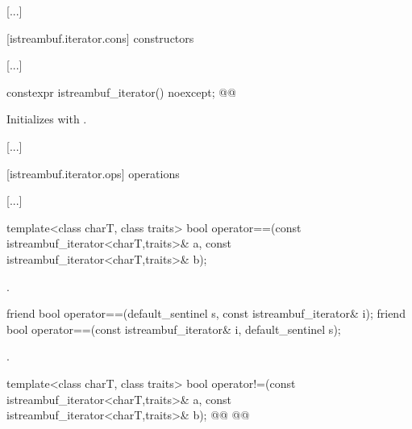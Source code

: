 [...]

\setcounter{subsubsection}{1}
[istreambuf.iterator.cons]{ constructors}

[...]

\setcounter{Paras}{1}
%
\begin{itemdecl}
constexpr istreambuf_iterator() noexcept;
@@
\end{itemdecl}

\begin{itemdescr}
\pnum
\effects
Initializes  with .
\end{itemdescr}

[...]

[istreambuf.iterator.ops]{ operations}

[...]

\setcounter{Paras}{5}
%
\begin{itemdecl}
template<class charT, class traits>
  bool operator==(const istreambuf_iterator<charT,traits>& a,
                  const istreambuf_iterator<charT,traits>& b);
\end{itemdecl}

\begin{itemdescr}
\pnum
\returns
{}.
\end{itemdescr}

\begin{addedblock}
%
\begin{itemdecl}
friend bool operator==(default_sentinel s, const istreambuf_iterator& i);
friend bool operator==(const istreambuf_iterator& i, default_sentinel s);
\end{itemdecl}

\begin{itemdescr}
\pnum
\returns {}.
\end{itemdescr}
\end{addedblock}

%
\begin{itemdecl}
template<class charT, class traits>
  bool operator!=(const istreambuf_iterator<charT,traits>& a,
                  const istreambuf_iterator<charT,traits>& b);
@@
@@
\end{itemdecl}


